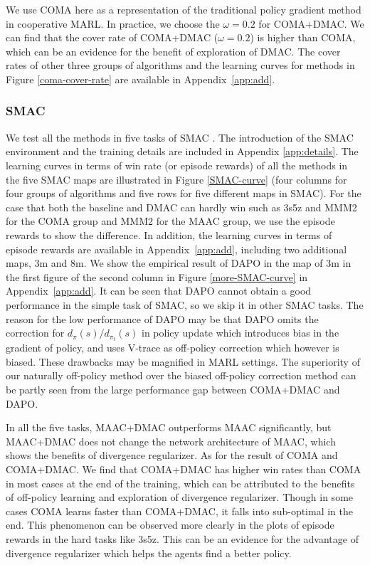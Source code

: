 \documentclass{article}
\begin{document}
We use COMA here as a representation of the traditional policy gradient method in cooperative MARL. In practice, we choose the $\omega=0.2$ for COMA+DMAC.  We can find that the cover rate of COMA+DMAC ($\omega=0.2$) is higher than COMA, which can be an evidence for the benefit of exploration of DMAC. The cover rates of other three groups of algorithms and the learning curves for methods in Figure \ref{coma-cover-rate} are available in Appendix~\ref{app:add}.
\subsubsection*{SMAC}
We test all the methods in five tasks of SMAC \citep{SMAC}. The introduction of the SMAC environment and the training details are included in Appendix \ref{app:details}. The learning curves in terms of win rate (or episode rewards) of all the methods in the five SMAC maps are illustrated in Figure \ref{SMAC-curve} (four columns for four groups of algorithms and five rows for five different maps in SMAC).  For the case that both the baseline and DMAC can hardly win such as 3s5z and MMM2 for the COMA group and MMM2 for the MAAC group, we use the episode rewards to show the difference. In addition, the learning curves in terms of episode rewards are available in Appendix~\ref{app:add}, including two additional maps, 3m and 8m. We show the empirical result of DAPO in the map of 3m in the first figure of the second column in Figure \ref{more-SMAC-curve} in Appendix~\ref{app:add}. It can be seen that DAPO cannot obtain a good performance in the simple task of SMAC, so we skip it in other SMAC tasks. The reason for the low performance of DAPO may be that DAPO omits the correction for $d_\pi(s)/d_{\pi_t}(s)$ in policy update which introduces bias in the gradient of policy, and uses V-trace as off-policy correction which however is biased. These drawbacks may be magnified in MARL settings. The superiority of our naturally off-policy method over the biased off-policy correction method can be partly seen from the large performance gap between COMA+DMAC and DAPO.

In all the five tasks, MAAC+DMAC outperforms MAAC significantly, but MAAC+DMAC does not change the network architecture of MAAC, which shows the benefits of divergence regularizer.
As for the result of COMA and COMA+DMAC. We find that COMA+DMAC has higher win rates than COMA in most cases at the end of the training, which can be attributed to the benefits of off-policy learning and exploration of divergence regularizer. Though in some cases COMA learns faster than COMA+DMAC, it falls into sub-optimal in the end. This phenomenon can be observed more clearly in the plots of episode rewards in the hard tasks like 3s5z. This can be an evidence for the advantage of divergence regularizer which helps the agents find a better policy. 
\end{document}
